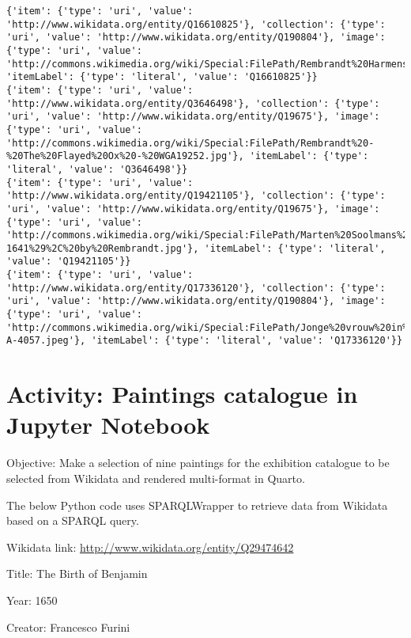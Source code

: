 \documentclass[
  letterpaper,
]{book}
\begin{document}
\begin{verbatim}
{'item': {'type': 'uri', 'value': 'http://www.wikidata.org/entity/Q16610825'}, 'collection': {'type': 'uri', 'value': 'http://www.wikidata.org/entity/Q190804'}, 'image': {'type': 'uri', 'value': 'http://commons.wikimedia.org/wiki/Special:FilePath/Rembrandt%20Harmensz.%20van%20Rijn%20154.jpg'}, 'itemLabel': {'type': 'literal', 'value': 'Q16610825'}}
{'item': {'type': 'uri', 'value': 'http://www.wikidata.org/entity/Q3646498'}, 'collection': {'type': 'uri', 'value': 'http://www.wikidata.org/entity/Q19675'}, 'image': {'type': 'uri', 'value': 'http://commons.wikimedia.org/wiki/Special:FilePath/Rembrandt%20-%20The%20Flayed%20Ox%20-%20WGA19252.jpg'}, 'itemLabel': {'type': 'literal', 'value': 'Q3646498'}}
{'item': {'type': 'uri', 'value': 'http://www.wikidata.org/entity/Q19421105'}, 'collection': {'type': 'uri', 'value': 'http://www.wikidata.org/entity/Q19675'}, 'image': {'type': 'uri', 'value': 'http://commons.wikimedia.org/wiki/Special:FilePath/Marten%20Soolmans%20%281613-1641%29%2C%20by%20Rembrandt.jpg'}, 'itemLabel': {'type': 'literal', 'value': 'Q19421105'}}
{'item': {'type': 'uri', 'value': 'http://www.wikidata.org/entity/Q17336120'}, 'collection': {'type': 'uri', 'value': 'http://www.wikidata.org/entity/Q190804'}, 'image': {'type': 'uri', 'value': 'http://commons.wikimedia.org/wiki/Special:FilePath/Jonge%20vrouw%20in%20gefantaseerde%20kleding%20Rijksmuseum%20SK-A-4057.jpeg'}, 'itemLabel': {'type': 'literal', 'value': 'Q17336120'}}
\end{verbatim}


\hypertarget{activity-paintings-catalogue-in-jupyter-notebook}{%
\chapter{Activity: Paintings catalogue in Jupyter
Notebook}\label{activity-paintings-catalogue-in-jupyter-notebook}}

Objective: Make a selection of nine paintings for the exhibition
catalogue to be selected from Wikidata and rendered multi-format in
Quarto.

The below Python code uses SPARQLWrapper to retrieve data from Wikidata
based on a SPARQL query.

Wikidata link: \url{http://www.wikidata.org/entity/Q29474642}

Title: The Birth of Benjamin

Year: 1650

Creator: Francesco Furini
\end{document}
